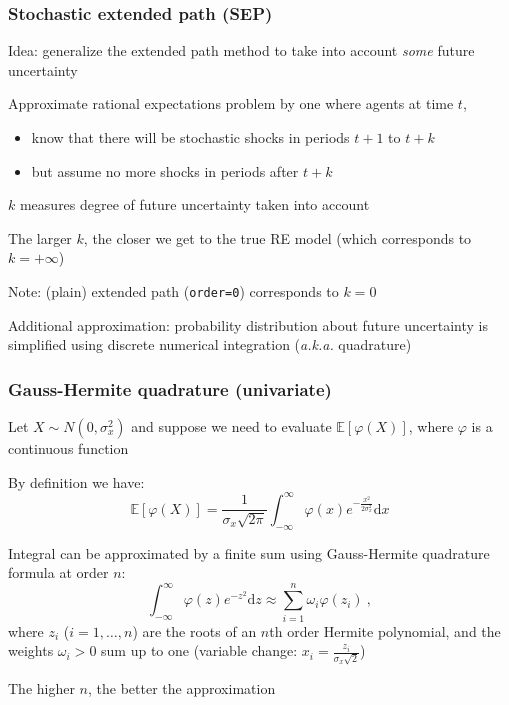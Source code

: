 \documentclass[handout,usepdftitle=false,xcolor=dvipsnames,aspectratio=169]{beamer}
\begin{document}
\begin{frame}
  \frametitle{Stochastic extended path (SEP)}
  \begin{witemize}
    \item Idea: generalize the extended path method to take into account
    \textit{some} future uncertainty
    \item Approximate rational expectations problem by one where agents at time $t$,
    \begin{itemize}
      \item know that there will be stochastic shocks in periods
            $t+1$ to $t+k$
      \item but assume no more shocks in periods after $t+k$
    \end{itemize}
    \item $k$ measures degree of future uncertainty taken into
    account
    \item The larger $k$, the closer we get to the true RE model (which corresponds to $k = +\infty$)
    \item Note: (plain) extended path (\texttt{order=0}) corresponds to $k=0$
    \item Additional approximation: probability distribution about future
    uncertainty is simplified using discrete numerical integration
    (\textit{a.k.a.} quadrature)
  \end{witemize}
\end{frame}

\begin{frame}
  \frametitle{Gauss-Hermite quadrature (univariate)}
  \begin{witemize}
    \item Let $X\sim N(0,\sigma_x^2)$ and suppose we need  to evaluate
    $\mathbb E  [\varphi(X)]$, where  $\varphi$ is a continuous function
    \item By definition we have:
    {\small\begin{equation}
      \mathbb E [\varphi(X)] =  \frac{1}{\sigma_x\sqrt{2\pi}}\int_{-\infty}^{\infty} \varphi(x)e^{-\frac{x^2}{2\sigma^2_x}}\mathrm dx
    \end{equation}
    }
    \item Integral can be approximated by a finite sum
    using Gauss-Hermite quadrature formula at order $n$:
    {\small
    \begin{equation}
      \int_{-\infty}^{\infty} \varphi(z)e^{-z^2}\mathrm dz \approx \sum_{i=1}^n\omega_i \varphi(z_i) \: ,
    \end{equation}
    }
    where $z_i$ ($i=1,\dots,n$) are the roots of an $n$th order Hermite  polynomial, and the weights  $\omega_i>0$ sum up to  one (variable change: $x_i  = \frac{z_i}{\sigma_x\sqrt{2}}$)
    \item The higher $n$, the better the approximation
  \end{witemize}
\end{frame}
\end{document}

